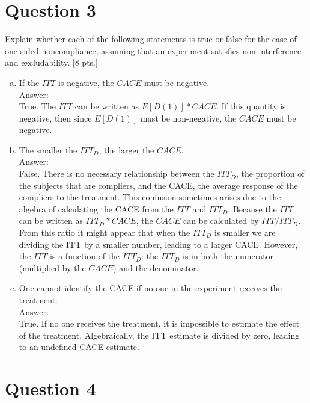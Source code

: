 \documentclass[11pt,notitlepage]{article}\usepackage[]{graphicx}\usepackage[]{color}
\makeatletter
\newenvironment{kframe}{%
 \def\at@end@of@kframe{}%
 \ifinner\ifhmode%
  \def\at@end@of@kframe{\end{minipage}}%
  \begin{minipage}{\columnwidth}%
 \fi\fi%
 \def\FrameCommand##1{\hskip\@totalleftmargin \hskip-\fboxsep
 \colorbox{shadecolor}{##1}\hskip-\fboxsep
     \hskip-\linewidth \hskip-\@totalleftmargin \hskip\columnwidth}%
 \MakeFramed {\advance\hsize-\width
   \@totalleftmargin\z@ \linewidth\hsize
   \@setminipage}}%
 {\par\unskip\endMakeFramed%
 \at@end@of@kframe}
\newenvironment{knitrout}{}{} %
\makeatother
\begin{document}
\section*{Question 3}
Explain whether each of the following statements is true or false for the case of one-sided noncompliance, assuming that an experiment satisfies non-interference and excludability. [8 pts.]
\begin{enumerate}[a)]
\item If the $ITT$ is negative, the $CACE$ must be negative.\\
Answer:\\
True. The $ITT$ can be written as $E[D(1)]*CACE$. If this quantity is negative, then since $E[D(1)]$ must be non-negative, the $CACE$ must be negative.  
\item The smaller the $ITT_D$, the larger the $CACE$.\\
Answer:\\
False. There is no necessary relationship between the $ITT_D$, the proportion of the subjects that are compliers, and the CACE, the average response of the compliers to the treatment. This confusion sometimes arises due to the algebra of calculating the CACE from the $ITT$ and $ITT_D$. Because the $ITT$ can be written as $ITT_D*CACE$, the $CACE$ can be calculated by $ITT/ITT_D$. From this ratio it might appear that when the $ITT_D$ is smaller we are dividing the ITT by a smaller number, leading to a larger CACE. However, the $ITT$ is a function of the $ITT_D$: the $ITT_D$ is in both the numerator (multiplied by the $CACE$) and the denominator.
\item One cannot identify the CACE if no one in the experiment receives the treatment.\\
Answer:\\
True. If no one receives the treatment, it is impossible to estimate the effect of the treatment. Algebraically, the ITT estimate is divided by zero, leading to an undefined CACE estimate. 
\end{enumerate}

\section*{Question 4}
\begin{knitrout}
\color{fgcolor}\begin{kframe}
\begin{verbatim}






\end{verbatim}
\end{kframe}
\end{knitrout}
\end{document}
